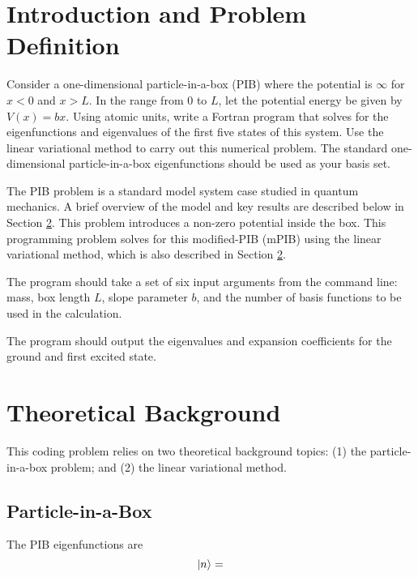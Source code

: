 \setdate{\today}
\setcounter{chapter}{1}
%

\makeheaderfooter{}
\maketitle
%
%
\section{Introduction and Problem Definition}
Consider a one-dimensional particle-in-a-box (PIB) where the potential is $\infty$ for $x < {}0$ and $x > L$. In the range from $0$ to $L$, let the potential energy be given by $V\left(x\right) = b x$. Using atomic units, write a Fortran program that solves for the eigenfunctions and eigenvalues of the first five states of this system. Use the linear variational method to carry out this numerical problem. The standard one-dimensional particle-in-a-box eigenfunctions should be used as your basis set.

The PIB problem is a standard model system case studied in quantum mechanics. A brief overview of the model and key results are described below in Section \ref{Section:TheoreticalBackground}. This problem introduces a non-zero potential inside the box. This programming problem solves for this modified-PIB (mPIB) using the linear variational method, which is also described in Section \ref{Section:TheoreticalBackground}.

The program should take a set of six input arguments from the command line: mass, box length $L$, slope parameter $b$, and the number of basis functions to be used in the calculation.

The program should output the eigenvalues and expansion coefficients for the ground and first excited state.

%
\section{Theoretical Background}\label{Section:TheoreticalBackground}
This coding problem relies on two theoretical background topics: (1) the particle-in-a-box problem; and (2) the linear variational method.

\subsection{Particle-in-a-Box}
The PIB eigenfunctions are
%
\begin{equation}
\displaystyle
  \left| n \right\rangle = 
\end{equation}


